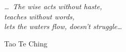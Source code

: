 \cleartorecto
\thispagestyle{empty}

\mbox{}\vfill

\noindent
{\itshape
  \ldots\ The wise acts without haste,\\
  teaches without words,\\
  lets the waters flow, doesn't struggle\ldots
}

\bigskip

\noindent
{\smaller Tao Te Ching}

\vfill\mbox{}
